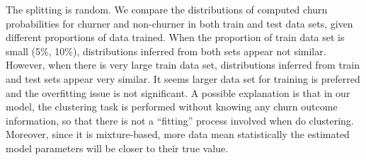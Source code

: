 The splitting is random. We compare the distributions of computed churn probabilities for churner and non-churner in both train and test data sets, given different proportions of data trained. When the proportion of train data set is small (5\%, 10\%), distributions inferred from both sets appear not similar. However, when there is very large train data set, distributions inferred from train and test sets appear very similar. It seems larger data set for training is preferred and the overfitting issue is not significant. A possible explanation is that in our model, the clustering task is performed without knowing any churn outcome information, so that there is not a ``fitting'' process involved when do clustering. Moreover, since it is mixture-based, more data mean statistically the estimated model parameters will be closer to their true value.